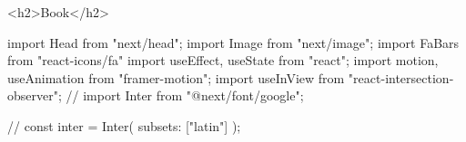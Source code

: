         <h2>Book</h2>













































        import Head from "next/head";
import Image from "next/image";
import { FaBars } from "react-icons/fa"
import { useEffect, useState } from "react";
import { motion, useAnimation } from "framer-motion";
import { useInView } from "react-intersection-observer";
// import { Inter } from "@next/font/google";

// const inter = Inter({ subsets: ["latin"] });

